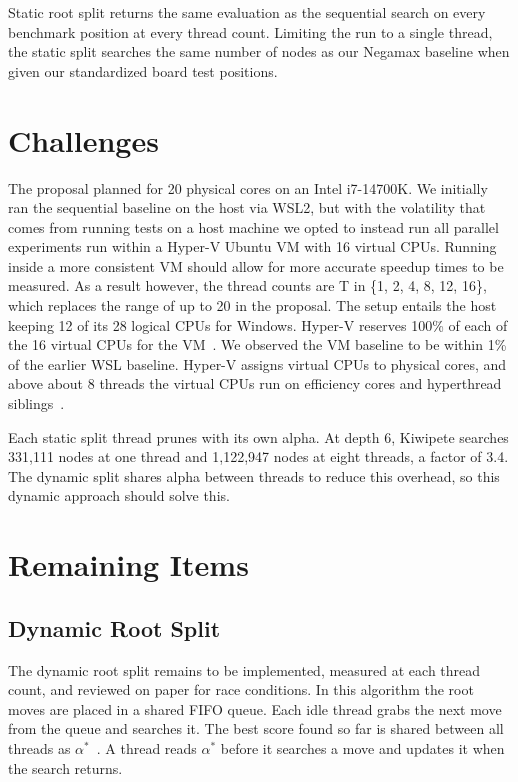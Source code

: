 \documentclass[10pt, conference, compsocconf]{IEEEtran}
\begin{document}
Static root split returns the same evaluation as the sequential search on every benchmark position at every thread count. Limiting the run to a single thread, the static split searches the same number of nodes as our Negamax baseline when given our standardized board test positions.

\section{Challenges}

The proposal planned for 20 physical cores on an Intel i7-14700K. We initially ran the sequential baseline on the host via WSL2, but with the volatility that comes from running tests on a host machine we opted to instead run all parallel experiments run within a Hyper-V Ubuntu VM with 16 virtual CPUs. Running inside a more consistent VM should allow for more accurate speedup times to be measured. As a result however, the thread counts are T in \{1, 2, 4, 8, 12, 16\}, which replaces the range of up to 20 in the proposal. The setup entails the host keeping 12 of its 28 logical CPUs for Windows. Hyper-V reserves 100\% of each of the 16 virtual CPUs for the VM~\cite{msvmprocessor}. We observed the VM baseline to be within 1\% of the earlier WSL baseline. Hyper-V assigns virtual CPUs to physical cores, and above about 8 threads the virtual CPUs run on efficiency cores and hyperthread siblings~\cite{marr2002}.

Each static split thread prunes with its own alpha. At depth 6, Kiwipete searches 331,111 nodes at one thread and 1,122,947 nodes at eight threads, a factor of 3.4. The dynamic split shares alpha between threads to reduce this overhead, so this dynamic approach should solve this.

\section{Remaining Items}

\subsection*{Dynamic Root Split}

The dynamic root split remains to be implemented, measured at each thread count, and reviewed on paper for race conditions. In this algorithm the root moves are placed in a shared FIFO queue. Each idle thread grabs the next move from the queue and searches it. The best score found so far is shared between all threads as $\alpha^{*}$~\cite{marsland1982}. A thread reads $\alpha^{*}$ before it searches a move and updates it when the search returns.
\end{document}
